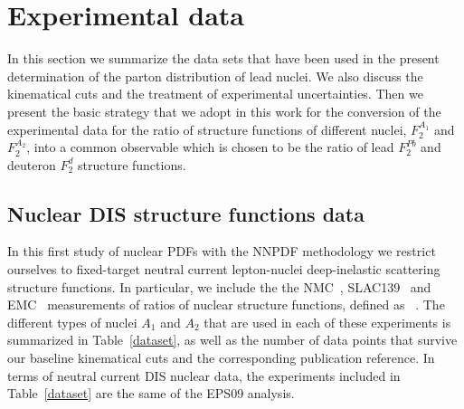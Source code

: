 
\section{Experimental data}

In this section we summarize the data sets that have been used
in the present determination of the parton distribution of lead nuclei.
%
We also discuss the kinematical cuts and the  treatment of experimental
uncertainties.
%
Then we present the basic strategy that we adopt in this work
for the conversion of the
experimental data for the ratio of structure functions of different nuclei, $F_2^{A_1}$ and $F_2^{A_2}$, into
a common observable which is chosen to be the ratio of lead $F_2^{Pb}$ and deuteron $F_2^d$ structure
functions.


\subsection{Nuclear DIS structure functions data}


%
In this first study of nuclear PDFs with the NNPDF methodology
we restrict ourselves to fixed-target neutral current lepton-nuclei
deep-inelastic scattering structure functions.
%
In particular, we include the the
NMC~\cite{Amaudruz:1995tq,Arneodo:1995cs,Arneodo:1996rv,Arneodo:1996ru}, SLAC139~\cite{PhysRevD.49.4348} and EMC~\cite{Ashman:1992kv}
measurements of ratios of nuclear structure functions, defined
as
\be
\label{eqratio}
 \, .
\ee
The different types of nuclei $A_1$ and $A_2$ that are used in each
of these experiments is summarized in  Table~\ref{dataset}, as well
as the number of data points that survive our baseline kinematical
cuts and the corresponding publication reference.
%
In terms of neutral current DIS nuclear data, the experiments included
in Table~\ref{dataset} are the same of the EPS09 analysis.


